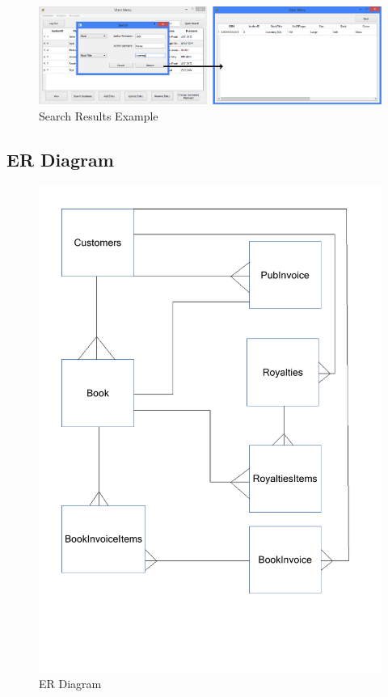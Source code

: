 \begin{figure}[H]
    \caption{Search Results Example} \label{fig:SearchExample}
    \includegraphics[width=\textwidth]{./Maintenance/UserInterface/SearchExample.png}
\end{figure}

\subsection{ER Diagram}

\begin{figure}[H]
    \caption{ER Diagram} \label{ER_Diagram.pdf}
    \includegraphics[width=\textwidth]{./Design/ER_Diagram.pdf}
\end{figure}


